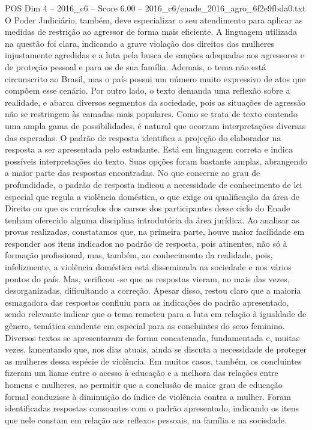 \begin{textsample}{POS Dim 4 – 2016\_c6 – Score 6.00 – 2016\_c6/enade\_2016\_agro\_6f2e9fbda0.txt}
O Poder Judiciário, também, deve especializar o seu atendimento para aplicar as medidas de restrição ao agressor de forma mais eficiente.
A linguagem utilizada na questão foi clara, indicando a grave violação dos direitos das mulheres injustamente agredidas e a luta pela busca de sanções adequadas aos agressores e de proteção pessoal e para os de sua família.
Ademais, o tema não está circunscrito ao Brasil, mas o país possui um número muito expressivo de atos que compõem esse cenário.
Por outro lado, o texto demanda uma reflexão sobre a realidade, e abarca diversos segmentos da sociedade, pois as situações de agressão não se restringem às camadas mais populares.
Como se trata de texto contendo uma ampla gama de possibilidades, é natural que ocorram interpretações diversas das esperadas.
O padrão de resposta identifica a projeção do elaborador na resposta a ser apresentada pelo estudante.
Está em linguagem correta e indica possíveis interpretações do texto.
Suas opções foram bastante amplas, abrangendo a maior parte das respostas encontradas.
No que concerne ao grau de profundidade, o padrão de resposta indicou a necessidade de conhecimento de lei especial que regula a violência doméstica, o que exige ou qualificação da área de Direito ou que os currículos dos cursos dos participantes desse ciclo do Enade tenham oferecido alguma disciplina introdutória da área jurídica.
Ao analisar as provas realizadas, constatamos que, na primeira parte, houve maior facilidade em responder aos itens indicados no padrão de resposta, pois atinentes, não só à formação profissional, mas, também, ao conhecimento da realidade, pois, infelizmente, a violência doméstica está disseminada na sociedade e nos vários pontos do país.
Mas, verificou -se que as respostas vieram, no mais das vezes, desorganizadas, dificultando a correção.
Apesar disso, restou claro que a maioria esmagadora das respostas confluiu para as indicações do padrão apresentado, sendo relevante indicar que o tema remeteu para a luta em relação à igualdade de gênero, temática candente em especial para as concluintes do sexo feminino.
Diversos textos se apresentaram de forma concatenada, fundamentada e, muitas vezes, lamentando que, nos dias atuais, ainda se discuta a necessidade de proteger as mulheres dessa espécie de violência.
Em muitos casos, também, os concluintes fizeram um liame entre o acesso à educação e a melhora das relações entre homens e mulheres, ao permitir que a conclusão de maior grau de educação formal conduzisse à diminuição do índice de violência contra a mulher.
Foram identificadas respostas consoantes com o padrão apresentado, indicando os itens que nele constam em relação aos reflexos pessoais, na família e na sociedade.

\end{textsample}
